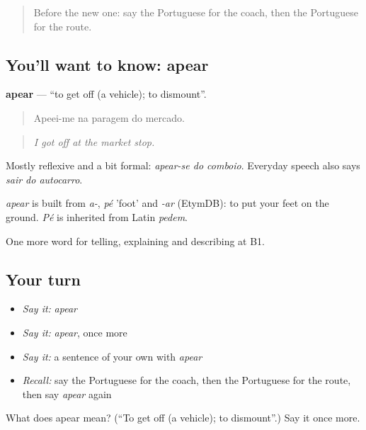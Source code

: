 \label{lesson:PT-C413-apear}



\begin{quote}
Before the new one: say the Portuguese for the coach, then the Portuguese for the route.
\end{quote}

\subsection*{You'll want to know: apear}
\textbf{apear} — \textquotedblleft{}to get off (a vehicle); to dismount\textquotedblright{}.

\begin{quote}
Apeei-me na paragem do mercado.
\end{quote}

\begin{quote}
\emph{I got off at the market stop.}
\end{quote}

Mostly reflexive and a bit formal: \emph{apear-se do comboio}. Everyday speech also says \emph{sair do autocarro}.

\begin{cousinweb}
\emph{apear} is built from \emph{a-}, \emph{pé} 'foot' and \emph{-ar} (EtymDB): to put your feet on the ground. \emph{Pé} is inherited from Latin \emph{pedem}.
\end{cousinweb}

\begin{grammarlens}[title={What you've built}]
One more word for telling, explaining and describing at B1.
\end{grammarlens}

\subsection*{Your turn}
\begin{itemize}
\raggedright
  \item \emph{Say it:} \emph{apear}
  \item \emph{Say it:} \emph{apear}, once more
  \item \emph{Say it:} a sentence of your own with \emph{apear}
  \item \emph{Recall:} say the Portuguese for the coach, then the Portuguese for the route, then say \emph{apear} again
\end{itemize}

\begin{tcolorbox}[breakable,colback=teal!4,colframe=teal!35!black,title={Before you move on}]
What does apear mean? (\textquotedblleft{}To get off (a vehicle); to dismount\textquotedblright{}.) Say it once more.
\end{tcolorbox}
